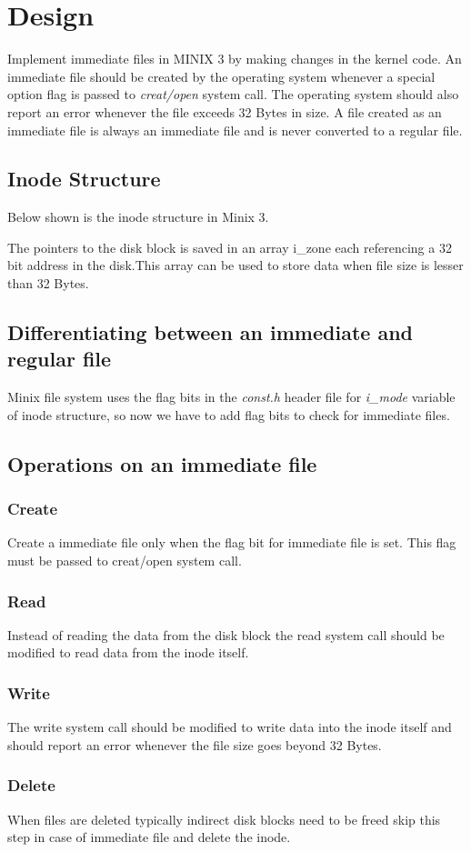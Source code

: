 \chapter{Design}

Implement immediate files in MINIX 3 by making changes in the kernel code. An immediate file should be created by the operating system whenever a special option flag is passed to {\em creat/open } system call. The operating system should also report an error whenever the file exceeds 32 Bytes in size. A file created as an immediate file is always an immediate file and is never converted to a regular file.

\section{Inode Structure}
Below shown is the inode structure in Minix 3.



The pointers to the disk block is saved in an array i\_zone each referencing a 32 bit address in the disk.This array can be used to store data when file size is lesser than 32 Bytes. 

\section{Differentiating between an immediate and regular file}

Minix file system uses the flag bits in the {\em const.h} header file for { \em i\_mode} variable of inode structure, so now we have to add flag bits to check for immediate files.

\section{Operations on an immediate file}
\subsection{Create}
Create a immediate file only when the flag bit for immediate file is set. This flag must be passed to creat/open system call.
\subsection{Read}
Instead of reading the data from the disk block the read system call should be modified to read data from the inode itself.
\subsection{Write}
The write system call should be modified to write data into the inode itself and should report an error whenever the file size goes beyond 32 Bytes.
\subsection{Delete}
When files are deleted typically indirect disk blocks need to be freed skip this step in case of immediate file and delete the inode.
